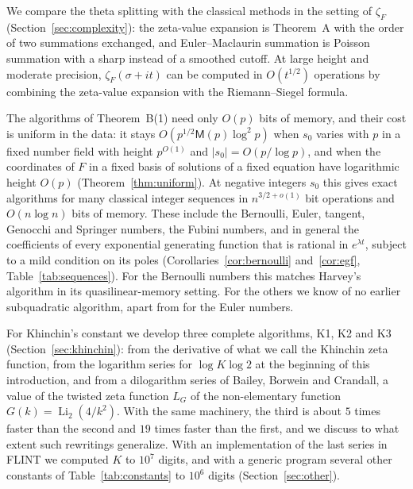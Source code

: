 \documentclass[11pt,reqno]{amsart}
\theoremstyle{definition}
\theoremstyle{remark}
\newcommand{\Li}{\operatorname{Li}}
\newcommand{\Mul}{\mathsf{M}}
\begin{document}
We compare the theta splitting with the classical methods in the setting of $\zeta_F$ (Section~\ref{sec:complexity}): the
zeta-value expansion is Theorem~A with the order of two summations exchanged, and Euler--Maclaurin summation is Poisson
summation with a sharp instead of a smoothed cutoff. At large height and moderate precision, $\zeta_F(\sigma + i t)$ can be computed
in $O(t^{1/2})$ operations by combining the zeta-value expansion with the Riemann--Siegel formula.

The algorithms of Theorem~B(1) need only $O(p)$ bits of memory, and their cost is uniform in the data: it stays
$O(p^{1/2}\Mul(p)\log^2p)$ when $s_0$ varies with $p$ in a fixed number field with height $p^{O(1)}$ and
$|s_0| = O(p/\log p)$, and when the coordinates of $F$ in a fixed basis of solutions of a fixed equation have
logarithmic height $O(p)$ (Theorem~\ref{thm:uniform}). At negative integers $s_0$ this gives exact algorithms for many classical
integer sequences in $n^{3/2+o(1)}$ bit operations and $O(n\log n)$ bits of memory. These include the Bernoulli,
Euler, tangent, Genocchi and Springer numbers, the Fubini numbers, and in general the coefficients of every
exponential generating function that is rational in $e^{\lambda t}$, subject to a mild condition on its poles
(Corollaries~\ref{cor:bernoulli} and~\ref{cor:egf}, Table~\ref{tab:sequences}). For the Bernoulli numbers this matches
Harvey's algorithm \cite{Har14} in its quasilinear-memory setting. For the others we know of no earlier subquadratic
algorithm, apart from \cite{Joh21} for the Euler numbers.

For Khinchin's constant we develop three complete algorithms, K1, K2 and K3 (Section~\ref{sec:khinchin}): from
the derivative of what we call the Khinchin zeta function,
from the logarithm series for $\log K\log 2$ at the beginning of this introduction, and from a
dilogarithm series of Bailey, Borwein
and Crandall, a value of the twisted zeta function $L_G$ of the non-elementary function $G(k) = \Li_2(4/k^2)$. With the
same machinery, the third is about $5$ times faster than the second and $19$ times faster than the first,
and we discuss to what extent such rewritings generalize. With an implementation of
the last series in FLINT we computed $K$ to $10^7$ digits, and with a generic program several other constants of
Table~\ref{tab:constants} to $10^6$ digits (Section~\ref{sec:other}).
\end{document}
